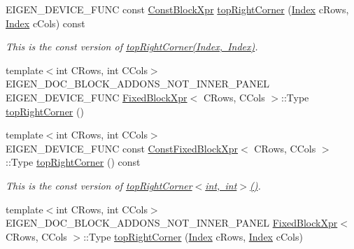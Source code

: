 \begin{DoxyCompactItemize}
\item 
\mbox{\label{class_eigen_1_1_sparse_matrix_base_a3308013aabe7ed2f28deb5a30b3b9a09}} 
E\+I\+G\+E\+N\+\_\+\+D\+E\+V\+I\+C\+E\+\_\+\+F\+U\+NC const \mbox{\hyperlink{class_eigen_1_1_block}{Const\+Block\+Xpr}} \mbox{\hyperlink{class_eigen_1_1_sparse_matrix_base_a3308013aabe7ed2f28deb5a30b3b9a09}{top\+Right\+Corner}} (\mbox{\hyperlink{struct_eigen_1_1_eigen_base_a554f30542cc2316add4b1ea0a492ff02}{Index}} c\+Rows, \mbox{\hyperlink{struct_eigen_1_1_eigen_base_a554f30542cc2316add4b1ea0a492ff02}{Index}} c\+Cols) const
\begin{DoxyCompactList}\small\item\em This is the const version of \mbox{\hyperlink{class_eigen_1_1_sparse_matrix_base_a709232ffb83f5c4c054de1c7655e8b99}{top\+Right\+Corner(\+Index, Index)}}. \end{DoxyCompactList}\item 
{\footnotesize template$<$int C\+Rows, int C\+Cols$>$ }\\E\+I\+G\+E\+N\+\_\+\+D\+O\+C\+\_\+\+B\+L\+O\+C\+K\+\_\+\+A\+D\+D\+O\+N\+S\+\_\+\+N\+O\+T\+\_\+\+I\+N\+N\+E\+R\+\_\+\+P\+A\+N\+EL E\+I\+G\+E\+N\+\_\+\+D\+E\+V\+I\+C\+E\+\_\+\+F\+U\+NC \mbox{\hyperlink{struct_eigen_1_1_sparse_matrix_base_1_1_fixed_block_xpr}{Fixed\+Block\+Xpr}}$<$ C\+Rows, C\+Cols $>$\+::Type \mbox{\hyperlink{class_eigen_1_1_sparse_matrix_base_a4079d9bb1b0f18bb7f32f711608624b6}{top\+Right\+Corner}} ()
\item 
\mbox{\label{class_eigen_1_1_sparse_matrix_base_a6d22c5b0afbf01233fea14e6481d2377}} 
{\footnotesize template$<$int C\+Rows, int C\+Cols$>$ }\\E\+I\+G\+E\+N\+\_\+\+D\+E\+V\+I\+C\+E\+\_\+\+F\+U\+NC const \mbox{\hyperlink{struct_eigen_1_1_sparse_matrix_base_1_1_const_fixed_block_xpr}{Const\+Fixed\+Block\+Xpr}}$<$ C\+Rows, C\+Cols $>$\+::Type \mbox{\hyperlink{class_eigen_1_1_sparse_matrix_base_a6d22c5b0afbf01233fea14e6481d2377}{top\+Right\+Corner}} () const
\begin{DoxyCompactList}\small\item\em This is the const version of \mbox{\hyperlink{class_eigen_1_1_sparse_matrix_base_a4079d9bb1b0f18bb7f32f711608624b6}{top\+Right\+Corner$<$int, int$>$()}}. \end{DoxyCompactList}\item 
{\footnotesize template$<$int C\+Rows, int C\+Cols$>$ }\\E\+I\+G\+E\+N\+\_\+\+D\+O\+C\+\_\+\+B\+L\+O\+C\+K\+\_\+\+A\+D\+D\+O\+N\+S\+\_\+\+N\+O\+T\+\_\+\+I\+N\+N\+E\+R\+\_\+\+P\+A\+N\+EL \mbox{\hyperlink{struct_eigen_1_1_sparse_matrix_base_1_1_fixed_block_xpr}{Fixed\+Block\+Xpr}}$<$ C\+Rows, C\+Cols $>$\+::Type \mbox{\hyperlink{class_eigen_1_1_sparse_matrix_base_a9db4c184e2222d0c9a945a191251d710}{top\+Right\+Corner}} (\mbox{\hyperlink{struct_eigen_1_1_eigen_base_a554f30542cc2316add4b1ea0a492ff02}{Index}} c\+Rows, \mbox{\hyperlink{struct_eigen_1_1_eigen_base_a554f30542cc2316add4b1ea0a492ff02}{Index}} c\+Cols)

\end{DoxyCompactItemize}
